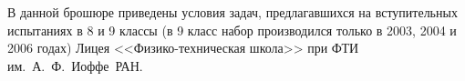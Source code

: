 \documentclass[12pt]{article}
\begin{document}
В данной брошюре приведены условия задач, предлагавшихся на
вступительных испытаниях в 8 и 9 классы (в 9 класс набор производился
только в 2003, 2004 и 2006 годах) Лицея <<Физико-техническая школа>> при
ФТИ им.~А.~Ф.~Иоффе~РАН. 
\end{document}
